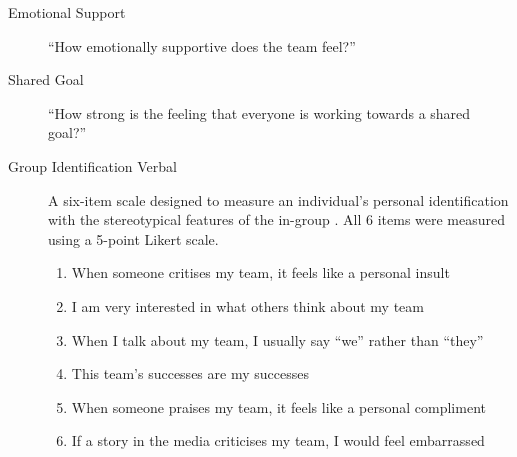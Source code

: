 \begin{CJK}{UTF8}{gbsn}



  \begin{description}
    \item [Emotional Support] ``How emotionally supportive does the team feel?''
    \item [Shared Goal] ``How strong is the feeling that everyone is working towards a shared goal?''
    \item [Group Identification Verbal] A six-item scale designed to measure an individual's personal identification with the stereotypical features of the in-group  \citep{Mael1992}.  All 6 items were measured using a 5-point Likert scale.
          \begin{enumerate}
            \item When someone critises my team, it feels like a personal insult
            \item I am very interested in what others think about my team
            \item When I talk about my team, I usually say ``we'' rather than ``they''
            \item This team's successes are my successes
            \item When someone praises my team, it feels like a personal compliment
            \item If a story in the media criticises my team, I would feel embarrassed
          \end{enumerate}


\end{description}
\end{CJK}
